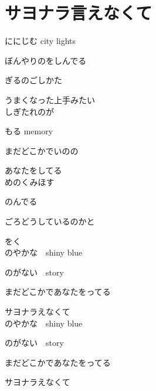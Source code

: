 \section{ サヨナラ言えなくて}
\large{

ににじむ city lights

ぼんやりのをしんでる

ぎるのごしかた

うまくなった上手みたい
\\

しぎたれのが

もる memory

まだどこかでいのの

あなたをしてる
\\

めのくみほす

のんでる

ごろどうしているのかと

をく
\\

のやかな　shiny blue

のがない　story

まだどこかであなたをってる

サヨナラえなくて
\\

のやかな　shiny blue

のがない　story

まだどこかであなたをってる

サヨナラえなくて

}